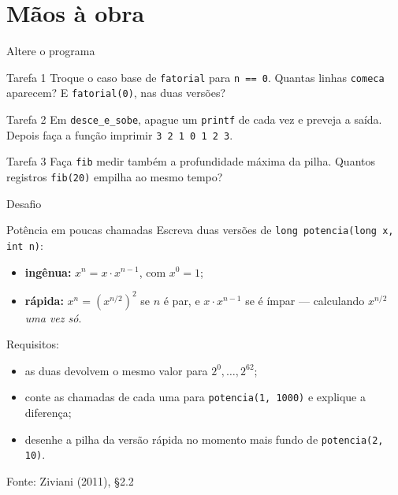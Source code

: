 \documentclass[aspectratio=169]{beamer}
\newcommand{\fonte}[1]{\vfill\hfill{\scriptsize\textcolor{UFSGray}{Fonte: #1}}}
\begin{document}
\section{Mãos à obra}

\begin{frame}{Altere o programa}
  \small
  \begin{block}{Tarefa 1}
    Troque o caso base de \texttt{fatorial} para \texttt{n == 0}. Quantas
    linhas \texttt{comeca} aparecem? E \texttt{fatorial(0)}, nas duas versões?
  \end{block}
  \begin{block}{Tarefa 2}
    Em \texttt{desce\_e\_sobe}, apague um \texttt{printf} de cada vez e
    preveja a saída. Depois faça a função imprimir \texttt{3 2 1 0 1 2 3}.
  \end{block}
  \begin{block}{Tarefa 3}
    Faça \texttt{fib} medir também a profundidade máxima da pilha. Quantos
    registros \texttt{fib(20)} empilha ao mesmo tempo?
  \end{block}
\end{frame}

\begin{frame}[fragile]{Desafio}
  \begin{block}{Potência em poucas chamadas}
    \small Escreva duas versões de \texttt{long potencia(long x, int n)}:
    \begin{itemize}
      \item \textbf{ingênua:} $x^n = x \cdot x^{n-1}$, com $x^0 = 1$;
      \item \textbf{rápida:} $x^n = (x^{n/2})^2$ se $n$ é par, e
        $x \cdot x^{n-1}$ se é ímpar --- calculando $x^{n/2}$ \emph{uma
        vez só}.
    \end{itemize}
    Requisitos:
    \begin{itemize}
      \item as duas devolvem o mesmo valor para $2^{0}, \ldots, 2^{62}$;
      \item conte as chamadas de cada uma para \texttt{potencia(1, 1000)}
        e explique a diferença;
      \item desenhe a pilha da versão rápida no momento mais fundo de
        \texttt{potencia(2, 10)}.
    \end{itemize}
  \end{block}
  \fonte{Ziviani (2011), §2.2~\cite{ziviani2011projeto}}
\end{frame}
\end{document}
